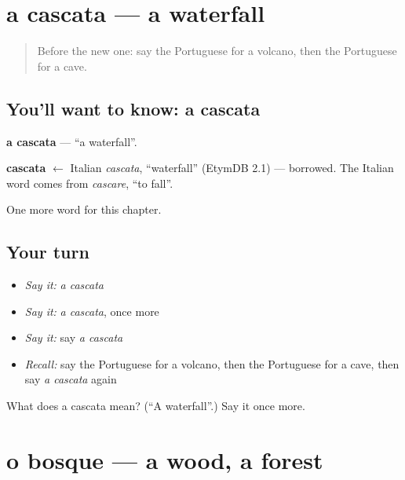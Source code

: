 \section[a cascata]{a cascata — a waterfall}

\label{lesson:PT-C117-cascata}



\begin{quote}
Before the new one: say the Portuguese for a volcano, then the Portuguese for a cave.
\end{quote}

\subsection*{You'll want to know: a cascata}
\textbf{a cascata} — \textquotedblleft{}a waterfall\textquotedblright{}.

\begin{cousinweb}
\textbf{cascata} $\leftarrow$ Italian \emph{cascata}, \textquotedblleft{}waterfall\textquotedblright{} (EtymDB 2.1) — borrowed. The Italian word comes from \emph{cascare}, \textquotedblleft{}to fall\textquotedblright{}.
\end{cousinweb}

\begin{grammarlens}[title={What you've built}]
One more word for this chapter.
\end{grammarlens}

\subsection*{Your turn}
\begin{itemize}
\raggedright
  \item \emph{Say it:} \emph{a cascata}
  \item \emph{Say it:} \emph{a cascata}, once more
  \item \emph{Say it:} say \emph{a cascata}
  \item \emph{Recall:} say the Portuguese for a volcano, then the Portuguese for a cave, then say \emph{a cascata} again
\end{itemize}

\begin{tcolorbox}[breakable,colback=teal!4,colframe=teal!35!black,title={Before you move on}]
What does a cascata mean? (\textquotedblleft{}A waterfall\textquotedblright{}.) Say it once more.
\end{tcolorbox}
\section[o bosque]{o bosque — a wood, a forest}

